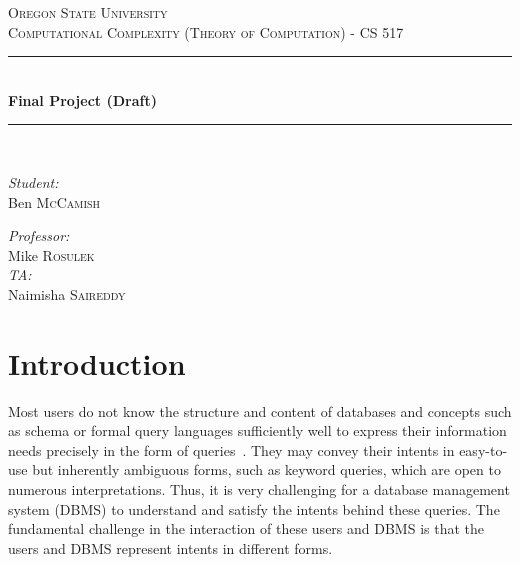 \documentclass{article}
\newcommand{\HRule}{\rule{\linewidth}{0.5mm}}
\begin{document}
\begin{titlepage}
\begin{center}

\textsc{\LARGE Oregon State University}\\[1.5cm]

\textsc{\Large Computational Complexity (Theory of Computation) - CS 517}\\[0.5cm]

\HRule \\[0.4cm]
{ \huge \bfseries Final Project (Draft)\\[0.4cm] }

\HRule \\[1.5cm]

\noindent
\begin{minipage}{0.4\textwidth}
\begin{flushleft} \large
\emph{Student:}\\
Ben \textsc{McCamish}
\end{flushleft}
\end{minipage}%
\begin{minipage}{0.4\textwidth}
\begin{flushright} \large
\emph{Professor:} \\
Mike \textsc{Rosulek}\\
\emph{TA:} \\
Naimisha \textsc{Saireddy}
\end{flushright}
\end{minipage}

\vfill


\end{center}
\end{titlepage}

\section{Introduction}
Most users do not know the structure and content of databases and concepts such as schema or formal query languages sufficiently well to express their information needs precisely in the form of queries~\cite{Usable:Jagadish,Chen:2009:KSS,Idreos:SIGMOD:2015}. They may convey their intents in easy-to-use but inherently ambiguous forms, such as keyword queries, which are open to numerous interpretations. Thus, it is very challenging for a database management system (DBMS) to understand and satisfy the intents behind these queries. The fundamental challenge in the interaction of these users and DBMS is that the users and DBMS represent intents in different forms.
\end{document}
